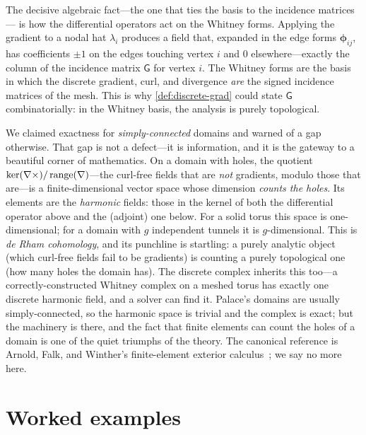 The decisive algebraic fact---the one that ties the basis to the incidence matrices---
is how the differential operators act on the Whitney forms. Applying the gradient to a
nodal hat $\lambda_i$ produces a field that, expanded in the edge forms
$\boldsymbol\phi_{ij}$, has coefficients $\pm 1$ on the edges touching vertex $i$ and
$0$ elsewhere---exactly the column of the incidence matrix $\mathsf{G}$ for vertex
$i$. The Whitney forms are the basis in which the discrete gradient, curl, and
divergence \emph{are} the signed incidence matrices of the mesh. This is why
\cref{def:discrete-grad} could state $\mathsf{G}$ combinatorially: in the Whitney
basis, the analysis is purely topological.

\begin{remark}
\label{rmk:cohomology}
We claimed exactness for \emph{simply-connected} domains and warned of a gap
otherwise. That gap is not a defect---it is information, and it is the gateway to a
beautiful corner of mathematics. On a domain with holes, the quotient
$\ker(\nabla\times)/\operatorname{range}(\nabla)$---the curl-free fields that are \emph{not}
gradients, modulo those that are---is a finite-dimensional vector space whose
dimension \emph{counts the holes}. Its elements are the \emph{harmonic} fields: those
in the kernel of both the differential operator above and the (adjoint) one below.
For a solid torus this space is one-dimensional; for a domain with $g$ independent
tunnels it is $g$-dimensional. This is \emph{de Rham cohomology}, and its punchline is
startling: a purely analytic object (which curl-free fields fail to be gradients) is
counting a purely topological one (how many holes the domain has). The discrete
complex inherits this too---a correctly-constructed Whitney complex on a meshed torus
has exactly one discrete harmonic field, and a solver can find it. Palace's domains
are usually simply-connected, so the harmonic space is trivial and the complex is
exact; but the machinery is there, and the fact that finite elements can count the
holes of a domain is one of the quiet triumphs of the theory. The canonical reference
is Arnold, Falk, and Winther's finite-element exterior calculus~\citep{arnold2006feec};
we say no more here.
\end{remark}

\section{Worked examples}

